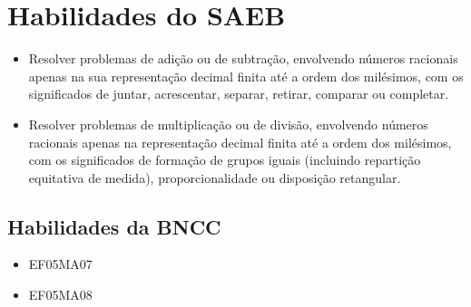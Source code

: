 \section*{Habilidades do SAEB}

\begin{itemize}
\item Resolver problemas de adição ou de subtração, envolvendo números
racionais apenas na sua representação decimal finita até a ordem dos
milésimos, com os significados de juntar, acrescentar, separar, retirar,
comparar ou completar.

\item Resolver problemas de multiplicação ou de divisão, envolvendo números
racionais apenas na representação decimal finita até a ordem dos
milésimos, com os significados de formação de grupos iguais (incluindo
repartição equitativa de medida), proporcionalidade ou disposição
retangular.
\end{itemize}

\subsection{Habilidades da BNCC}

\begin{itemize}
\item EF05MA07

\item EF05MA08
\end{itemize}


